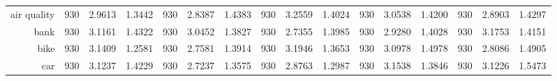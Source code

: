 \begin{table}[htbp]
{\begin{tabular}{rccccccccccccccc}
			air quality                         & 930                                     & 2.9613                                                                    & 1.3442          & 930                            & \cellcolor[rgb]{ .776,  .937,  .808}\textcolor[rgb]{ 0,  .38,  0}{2.8387} & 1.4383          & 930                             & 3.2559                                                                             & 1.4024          & 930                             & 3.0538                                                                    & 1.4200          & 930                             & 2.8903                                                                    & 1.4297          \\
			bank                                & 930                                     & 3.1161                                                                    & 1.4322          & 930                            & 3.0452                                                                    & 1.3827          & 930                             & \cellcolor[rgb]{ .776,  .937,  .808}\textcolor[rgb]{ 0,  .38,  0}{2.7355}          & 1.3985          & 930                             & 2.9280                                                                    & 1.4028          & 930                             & 3.1753                                                                    & 1.4151          \\
			bike                                & 930                                     & 3.1409                                                                    & 1.2581          & 930                            & \cellcolor[rgb]{ .776,  .937,  .808}\textcolor[rgb]{ 0,  .38,  0}{2.7581} & 1.3914          & 930                             & 3.1946                                                                             & 1.3653          & 930                             & 3.0978                                                                    & 1.4978          & 930                             & 2.8086                                                                    & 1.4905          \\
			car                                 & 930                                     & 3.1237                                                                    & 1.4229          & 930                            & \cellcolor[rgb]{ .776,  .937,  .808}\textcolor[rgb]{ 0,  .38,  0}{2.7237} & 1.3575          & 930                             & 2.8763                                                                             & 1.2987          & 930                             & 3.1538                                                                    & 1.3846          & 930                             & 3.1226                                                                    & 1.5473          \\

\end{tabular}}
\end{table}
